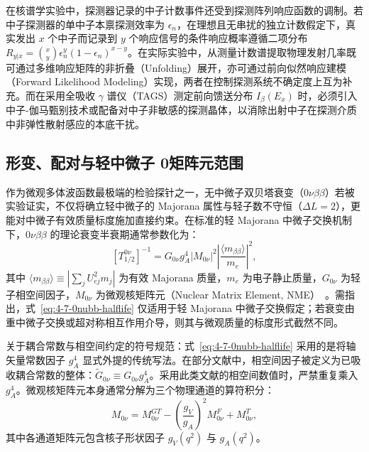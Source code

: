 在核谱学实验中，探测器记录的中子计数事件还受到探测阵列响应函数的调制。若中子探测器的单中子本禀探测效率为 $\epsilon_n$，在理想且无串扰的独立计数假定下，真实发出 $x$ 个中子而记录到 $y$ 个响应信号的条件响应概率遵循二项分布 $R_{y|x} = \binom{x}{y} \epsilon_n^y (1 - \epsilon_n)^{x-y}$。在实际实验中，从测量计数谱提取物理发射几率既可通过多维响应矩阵的非折叠（Unfolding）展开，亦可通过前向似然响应建模（Forward Likelihood Modeling）实现，两者在控制探测系统不确定度上互为补充。而在采用全吸收 $\gamma$ 谱仪（TAGS）测定前向馈送分布 $I_\beta(E_x)$ 时，必须引入中子-伽马甄别技术或配备对中子非敏感的探测晶体，以消除出射中子在探测介质中非弹性散射感应的本底干扰。

\subsection{形变、配对与轻中微子 0\nu\beta\beta 矩阵元范围}\label{sec:4-7-3}

作为微观多体波函数最极端的检验探针之一，无中微子双贝塔衰变（$0\nu\beta\beta$）若被实验证实，不仅将确立轻中微子的 Majorana 属性与轻子数不守恒（$\Delta L = 2$），更能对中微子有效质量标度施加直接约束。在标准的轻 Majorana 中微子交换机制下，$0\nu\beta\beta$ 的理论衰变半衰期通常参数化为：
\begin{equation}\label{eq:4-7-0nubb-halflife}
\left[ T_{1/2}^{0\nu} \right]^{-1} = G_{0\nu} g_A^4 |M_{0\nu}|^2 \left| \frac{\langle m_{\beta\beta} \rangle}{m_e} \right|^2,
\end{equation}
其中 $\langle m_{\beta\beta} \rangle \equiv |\sum_{j} U_{ej}^2 m_j|$ 为有效 Majorana 质量，$m_e$ 为电子静止质量，$G_{0\nu}$ 为轻子相空间因子，$M_{0\nu}$ 为微观核矩阵元（Nuclear Matrix Element, NME）~\cite{engel-menendez-2017-double-beta-matrix-elements-review}。需指出，式~\eqref{eq:4-7-0nubb-halflife} 仅适用于轻 Majorana 中微子交换假定；若衰变由重中微子交换或超对称相互作用介导，则其与微观质量的标度形式截然不同。

关于耦合常数与相空间约定的符号规范：式~\eqref{eq:4-7-0nubb-halflife} 采用的是将轴矢量常数因子 $g_A^4$ 显式外提的传统写法。在部分文献中，相空间因子被定义为已吸收耦合常数的整体：$\widetilde{G}_{0\nu} \equiv G_{0\nu} g_A^4$。采用此类文献的相空间数值时，严禁重复乘入 $g_A^4$。微观核矩阵元本身通常分解为三个物理通道的算符积分：
\begin{equation}\label{eq:4-7-NME-decomposition}
M_{0\nu} = M_{0\nu}^{GT} - \left(\frac{g_V}{g_A}\right)^2 M_{0\nu}^F + M_{0\nu}^T,
\end{equation}
其中各通道矩阵元包含核子形状因子 $g_V(q^2)$ 与 $g_A(q^2)$。

